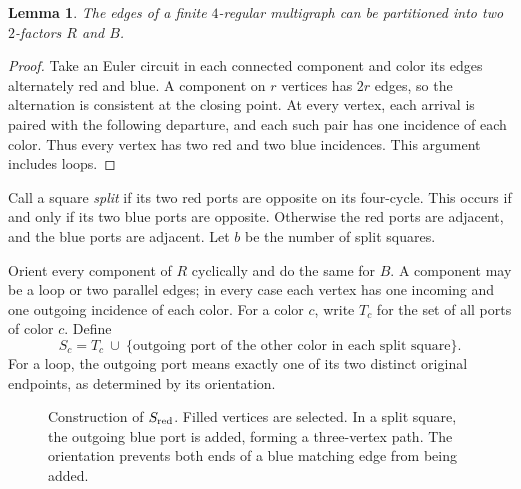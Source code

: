 \documentclass[11pt]{article}
\newtheorem{lemma}[theorem]{Lemma}
\begin{document}
\begin{lemma}\label{lem:factor}
The edges of a finite $4$-regular multigraph can be partitioned into
two $2$-factors $R$ and $B$.
\end{lemma}
\begin{proof}
Take an Euler circuit in each connected component and color its edges
alternately red and blue. A component on $r$ vertices has $2r$ edges,
so the alternation is consistent at the closing point. At every
vertex, each arrival is paired with the following departure, and
each such pair has one incidence of each color. Thus every vertex has
two red and two blue incidences. This argument includes loops.
\end{proof}

Call a square \emph{split} if its two red ports are opposite on its
four-cycle. This occurs if and only if its two blue ports are opposite.
Otherwise the red ports are adjacent, and the blue ports are adjacent.
Let $b$ be the number of split squares.

Orient every component of $R$ cyclically and do the same for $B$.
A component may be a loop or two parallel edges; in every case each
vertex has one incoming and one outgoing incidence of each color.
For a color $c$, write $T_c$ for the set of all ports of color $c$.
Define
\begin{equation}\label{eq:construction}
 S_c=T_c\ \cup\
 \{\text{outgoing port of the other color in each split square}\}.
\end{equation}
For a loop, the outgoing port means exactly one of its two distinct
original endpoints, as determined by its orientation.

\begin{figure}[ht]
\centering
{}
\caption{Construction of $S_{\rm red}$. Filled vertices are selected.
In a split square, the outgoing blue port is added, forming a
three-vertex path. The orientation prevents both ends of a blue
matching edge from being added.}
\label{fig:repair}
\end{figure}
\end{document}

